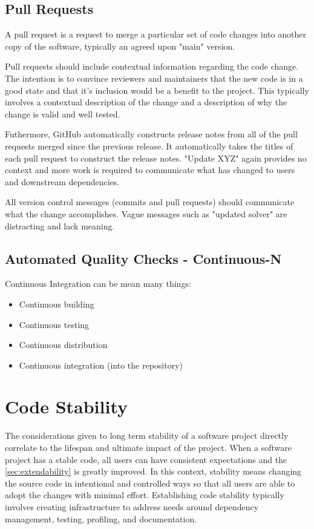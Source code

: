\documentclass[]{nrel}
\begin{document}
\section{Pull Requests}
A pull request is a request to merge a particular set of code changes into another copy of the
software, typically an agreed upon "main" version.

Pull requests should include contextual information regarding the code change. The intention is
to convince reviewers and maintainers that the new code is in a good state and that it’s
inclusion would be a benefit to the project. This typically involves a contextual description of
the change and a description of why the change is valid and well tested.

Futhermore, GitHub automatically constructs release notes from all of the pull requests merged
since the previous release.
It automatically takes the titles of each pull request to construct the release notes.
"Update XYZ" again provides no context and more work is required to communicate what has changed
to users and downstream dependencies.

All version control messages (commits and pull requests) should communicate what the change
accomplishes.
Vague messages such as "updated solver" are distracting and lack meaning.


\section{Automated Quality Checks - Continuous-N}
Continuous Integration can be mean many things:
\begin{itemize}
\item Continuous building

\item Continuous testing

\item Continuous distribution

\item Continuous integration (into the repository)

\end{itemize}


\chapter{Code Stability}
The considerations given to long term stability of a software project directly correlate to the
lifespan and ultimate impact of the project.
When a software project has a stable code, all users can have consistent expectations
and the \ref{sec:extendability} is greatly improved.
In this context, stability means changing the source code in intentional and controlled ways
so that all users are able to adopt the changes with minimal effort.
Establishing code stability typically involves creating infrastructure to address needs around
dependency management, testing, profiling, and documentation.
\end{document}
